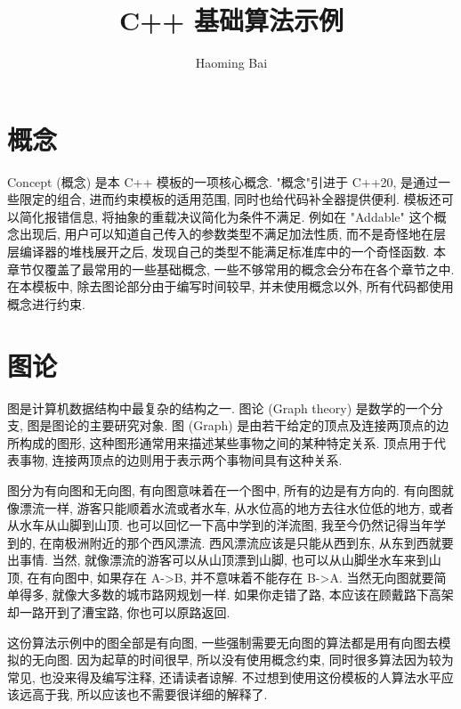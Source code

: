 \documentclass[a4paper]{ctexart}
\title{C++ 基础算法示例}
\author{Haoming Bai}
\begin{document}
\maketitle
\tableofcontents

\section{概念}

Concept (概念) 是本 C++ 模板的一项核心概念. "概念"引进于 C++20, 是通过一些限定的组合, 进而约束模板的适用范围, 同时也给代码补全器提供便利. 模板还可以简化报错信息, 将抽象的重载决议简化为条件不满足. 例如在 "Addable" 这个概念出现后, 用户可以知道自己传入的参数类型不满足加法性质, 而不是奇怪地在层层编译器的堆栈展开之后, 发现自己的类型不能满足标准库中的一个奇怪函数. 本章节仅覆盖了最常用的一些基础概念, 一些不够常用的概念会分布在各个章节之中. 在本模板中, 除去图论部分由于编写时间较早, 并未使用概念以外, 所有代码都使用概念进行约束.



\section{图论}

图是计算机数据结构中最复杂的结构之一. 图论 (Graph theory) 是数学的一个分支, 图是图论的主要研究对象. 图 (Graph) 是由若干给定的顶点及连接两顶点的边所构成的图形, 这种图形通常用来描述某些事物之间的某种特定关系. 顶点用于代表事物, 连接两顶点的边则用于表示两个事物间具有这种关系. 

图分为有向图和无向图, 有向图意味着在一个图中, 所有的边是有方向的. 有向图就像漂流一样, 游客只能顺着水流或者水车, 从水位高的地方去往水位低的地方, 或者从水车从山脚到山顶. 也可以回忆一下高中学到的洋流图, 我至今仍然记得当年学到的, 在南极洲附近的那个西风漂流. 西风漂流应该是只能从西到东, 从东到西就要出事情. 当然, 就像漂流的游客可以从山顶漂到山脚, 也可以从山脚坐水车来到山顶, 在有向图中, 如果存在 A->B, 并不意味着不能存在 B->A. 当然无向图就要简单得多, 就像大多数的城市路网规划一样. 如果你走错了路, 本应该在顾戴路下高架却一路开到了漕宝路, 你也可以原路返回.

这份算法示例中的图全部是有向图, 一些强制需要无向图的算法都是用有向图去模拟的无向图. 因为起草的时间很早, 所以没有使用概念约束, 同时很多算法因为较为常见, 也没来得及编写注释, 还请读者谅解. 不过想到使用这份模板的人算法水平应该远高于我, 所以应该也不需要很详细的解释了.


\end{document}

